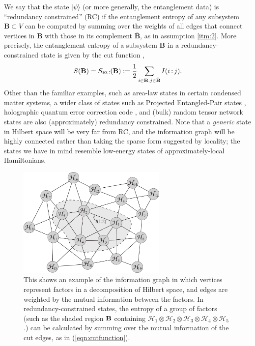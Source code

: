 \documentclass[%
preprint,
nofootinbib,
amsmath,amssymb,
aps,
prd,
showpacs,
superscriptaddress
]{revtex4-1}
\DeclareMathOperator{\co}{:}
\begin{document}
We say that the state $|\psi\rangle$ (or more generally, the entanglement data) is ``redundancy constrained'' (RC) if the entanglement entropy of any subsystem $\textbf{B}\subset V$ can be computed by summing over the weights of all edges that connect vertices in $\textbf{B}$ with those in its complement $\bar{\textbf{B}}$, as in assumption \ref{itm:2}. More precisely, the entanglement entropy of a subsystem $\textbf{B}$ in a redundancy-constrained state is given by the cut function \cite{Bao:2015boa},
\begin{equation}
 S(\textbf{B})=S_{\rm RC}(\textbf{B}):=\frac 1 2 \sum_{i\in\textbf{B},j\in\bar{\textbf{B}}} I(i\co j).
 \label{eqn:cutfunction}
\end{equation}
Other than the familiar examples, such as area-law states  \cite{AreaLawEntRev} in certain condensed matter systems, a wider class of states such as Projected Entangled-Pair states \cite{Orus:2013kga}, holographic quantum error correction code \cite{Pastawski:2015qua}, and (bulk) random tensor network states \cite{Hayden:2016cfa} are also (approximately) redundancy constrained.
Note that a \emph{generic} state in Hilbert space will be very far from RC, and the information graph will be highly connected rather than taking the sparse form suggested by locality; the states we have in mind resemble low-energy states of approximately-local Hamiltonians.

\begin{figure}
 \includegraphics[width=0.65\textwidth]{rc-graph.pdf}
\caption{This shows an example of the information graph in which vertices represent factors in a decomposition of Hilbert space, and edges are weighted by the mutual information between the factors. In redundancy-constrained states, the entropy of a group of factors (such as the shaded region ${\bold B}$ containing $\mathcal{H}_1\otimes\mathcal{H}_2\otimes\mathcal{H}_3\otimes\mathcal{H}_4\otimes\mathcal{H}_5$.) can be calculated by summing over the mutual information of the cut edges, as in (\ref{eqn:cutfunction}).
}
\label{fig:regions}
\end{figure}
\end{document}

